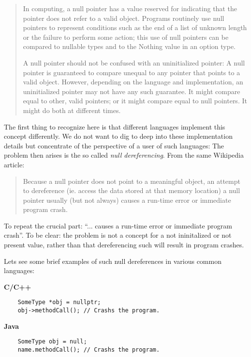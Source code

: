 \documentclass[a4paper,12pt]{article}
\begin{document}
\begin{quotation}
    In computing, a null pointer has a value reserved for indicating that the pointer does not refer to a valid object. Programs routinely use null pointers to represent conditions such as the end of a list of unknown length or the failure to perform some action; this use of null pointers can be compared to nullable types and to the Nothing value in an option type.

    A null pointer should not be confused with an uninitialized pointer: A null pointer is guaranteed to compare unequal to any pointer that points to a valid object. However, depending on the language and implementation, an uninitialized pointer may not have any such guarantee. It might compare equal to other, valid pointers; or it might compare equal to null pointers. It might do both at different times.
\end{quotation}

The first thing to recognize here is that different languages implement this concept differently. We do not want to dig to deep into these implementation details but concentrate of the perspective of a user of such languages: The problem then arises is the so called \textit{null dereferencing}. From the same Wikipedia\cite{null-wiki} article:

\begin{quotation}
    Because a null pointer does not point to a meaningful object, an attempt to dereference (ie. access the data stored at that memory location) a null pointer usually (but not always) causes a run-time error or immediate program crash.
\end{quotation}

To repeat the crucial part: ``... causes a run-time error or immediate program crash''. To be clear: the problem is not a concept for a not ininitalized or not present value, rather than that dereferencing such will result in program crashes.

Lets see some brief examples of such null dereferences in various common languages:

\textbf{C/C++}
\begin{verbatim}
    SomeType *obj = nullptr;
    obj->methodCall(); // Crashs the program.
\end{verbatim}

\textbf{Java}
\begin{verbatim}
    SomeType obj = null;
    name.methodCall(); // Crashs the program.
\end{verbatim}
\end{document}
